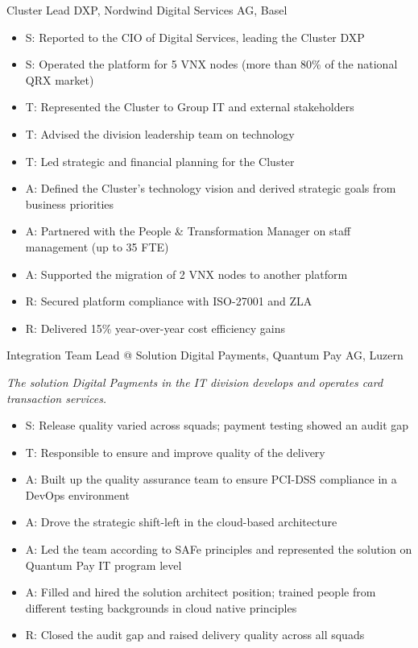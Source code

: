 \documentclass[10.5pt,a4paper]{article}
\newlength{\datewidth}
\newcommand{\entryline}[2]{%
  \par\noindent\makebox[\datewidth][l]{#1}#2\par
}
\newcommand{\entrytwoline}[3]{%
  \par\noindent\makebox[\datewidth][l]{#1}#2\par
  \noindent\makebox[\datewidth][l]{}#3\par
}
\newcommand{\companydesc}[1]{\vspace{2pt}\textit{#1}\par}
\newenvironment{tightlist}{%
  \begin{itemize}[leftmargin=1.1em,itemsep=0pt,topsep=4pt,parsep=0pt,partopsep=0pt,label=\textbullet]
}{%
  \end{itemize}
}
\newcommand{\blockgap}{\vspace{8pt}}
\begin{document}
\blockgap

\entryline{09.2024 - 12.2025}{Cluster Lead DXP, Nordwind Digital Services AG, Basel}

\begin{tightlist}
  \item S: Reported to the CIO of Digital Services, leading the Cluster DXP
  \item S: Operated the platform for 5 VNX nodes (more than 80\% of the national QRX market)
  \item T: Represented the Cluster to Group IT and external stakeholders
  \item T: Advised the division leadership team on technology
  \item T: Led strategic and financial planning for the Cluster
  \item A: Defined the Cluster's technology vision and derived strategic goals from business priorities
  \item A: Partnered with the People \& Transformation Manager on staff management (up to 35 FTE)
  \item A: Supported the migration of 2 VNX nodes to another platform
  \item R: Secured platform compliance with ISO-27001 and ZLA
  \item R: Delivered 15\% year-over-year cost efficiency gains
\end{tightlist}

\blockgap

\entrytwoline{04.2023 - 08.2024}{Integration Team Lead @ Solution Digital Payments, Quantum Pay AG, Luzern}{}
\vspace{-8pt}
\companydesc{The solution Digital Payments in the IT division develops and operates card transaction services.}

\begin{tightlist}
  \item S: Release quality varied across squads; payment testing showed an audit gap
  \item T: Responsible to ensure and improve quality of the delivery
  \item A: Built up the quality assurance team to ensure PCI-DSS compliance in a DevOps environment
  \item A: Drove the strategic shift-left in the cloud-based architecture
  \item A: Led the team according to SAFe principles and represented the solution on Quantum Pay IT program level
  \item A: Filled and hired the solution architect position; trained people from different testing backgrounds in cloud native principles
  \item R: Closed the audit gap and raised delivery quality across all squads
\end{tightlist}
\end{document}
